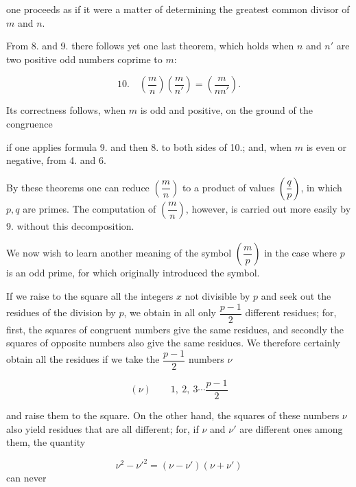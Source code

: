 one proceeds as if it were a matter of determining the greatest
common divisor of $m$ and $n$.

From 8. and 9. there follows yet one last theorem, which holds when
$n$ and $n'$ are two positive odd numbers coprime to $m$:

\[
10.\quad \left(\frac{m}{n}\right)\left(\frac{m}{n'}\right) = \left(\frac{m}{nn'}\right).
\]

Its correctness follows, when $m$ is odd and positive,
on the ground of the congruence


if one applies formula 9. and then 8. to both sides of 10.;
and, when $m$ is even or negative, from 4. and 6.

By these theorems one can reduce $\left(\dfrac{m}{n}\right)$ to a product of
values $\left(\dfrac{q}{p}\right)$, in which $p, q$ are primes. The
computation of $\left(\dfrac{m}{n}\right)$, however, is carried out more easily by 9. without this
decomposition.

We now wish to learn another meaning of the symbol
$\left(\dfrac{m}{p}\right)$ in the case where $p$ is an odd prime,
for which  originally introduced the symbol.

If we raise to the square all the integers $x$ not divisible by $p$
and seek out the residues of the division by $p$,
we obtain in all only $\dfrac{p-1}{2}$ different
residues; for, first, the squares of congruent numbers give the same
residues, and secondly the squares of opposite
numbers also give the same residues. We therefore certainly obtain all the
residues if we take the $\dfrac{p-1}{2}$ numbers $\nu$

\[
(\nu)\qquad 1,\ 2,\ 3\cdots\frac{p-1}{2}
\]

and raise them to the square. On the other hand, the
squares of these numbers $\nu$ also yield residues that are all different; for,
if $\nu$ and $\nu'$ are different ones among them, the quantity

\[
\nu^2 - \nu'^2 = (\nu - \nu')(\nu + \nu')
\]
can never
